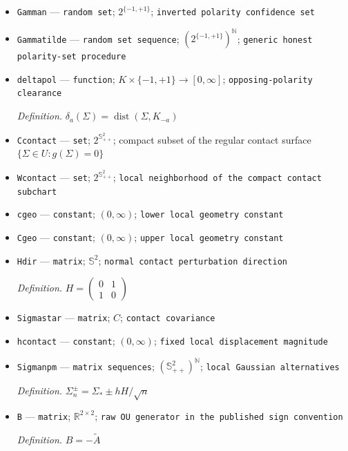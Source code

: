 \documentclass{article}
\begin{document}
\begin{itemize}
  \par\smallskip\noindent\emph{Definition.} \(j_n(S)=\min\{j:\lVert\Theta_j-S\rVert_F<\rho(S)+1/n\}\)
  \item \texttt{Gamman} --- \texttt{random set}; \(2^{\{-1,+1\}}\); \texttt{inverted polarity confidence set}
  \item \texttt{Gammatilde} --- \texttt{random set sequence}; \((2^{\{-1,+1\}})^{\mathbb N}\); \texttt{generic honest polarity-\allowbreak{}set procedure}
  \item \texttt{deltapol} --- \texttt{function}; \(K\times\{-1,+1\}\to[0,\infty]\); \texttt{opposing-\allowbreak{}polarity clearance}
  \par\smallskip\noindent\emph{Definition.} \(\delta_a(\Sigma)=\operatorname{dist}(\Sigma,K_{-a})\)
  \item \texttt{Ccontact} --- \texttt{set}; \(2^{\mathbb S_{++}^{2}}\); compact subset of the regular contact surface \(\{\Sigma\in U:g(\Sigma)=0\}\)
  \item \texttt{Wcontact} --- \texttt{set}; \(2^{\mathbb S_{++}^{2}}\); \texttt{local neighborhood of the compact contact subchart}
  \item \texttt{cgeo} --- \texttt{constant}; \((0,\infty)\); \texttt{lower local geometry constant}
  \item \texttt{Cgeo} --- \texttt{constant}; \((0,\infty)\); \texttt{upper local geometry constant}
  \item \texttt{Hdir} --- \texttt{matrix}; \(\mathbb S^{2}\); \texttt{normal contact perturbation direction}
  \par\smallskip\noindent\emph{Definition.} \(H=\begin{pmatrix}0&1\\1&0\end{pmatrix}\)
  \item \texttt{Sigmastar} --- \texttt{matrix}; \(C\); \texttt{contact covariance}
  \item \texttt{hcontact} --- \texttt{constant}; \((0,\infty)\); \texttt{fixed local displacement magnitude}
  \item \texttt{Sigmanpm} --- \texttt{matrix sequences}; \((\mathbb S_{++}^{2})^{\mathbb N}\); \texttt{local Gaussian alternatives}
  \par\smallskip\noindent\emph{Definition.} \(\Sigma_n^{\pm}=\Sigma_*\pm hH/\sqrt n\)
  \item \texttt{B} --- \texttt{matrix}; \(\mathbb R^{2\times2}\); \texttt{raw OU generator in the published sign convention}
  \par\smallskip\noindent\emph{Definition.} \(B=-\widetilde A\)

\end{itemize}
\end{document}
